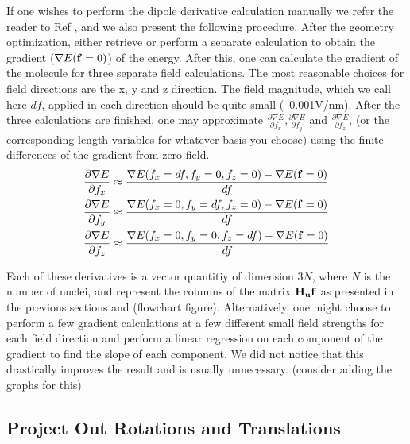 If one wishes to perform the dipole derivative calculation manually we refer the reader
to Ref \cite{kom}, and we also present the following procedure.  
After the geometry optimization, either retrieve or perform a separate calculation to obtain the gradient ($\nabla E({\bf{f}}=0)$) of the energy. 
After this, one can calculate the gradient of the molecule for three separate field calculations.  
The most reasonable choices for field directions are the x, y and z direction.  
The field magnitude, which we call here $df$,  applied in each direction should be quite
small (~0.001V/nm).  
After the three calculations are finished, one may approximate $\frac{\partial \nabla E}{\partial f_x}$,$\frac{\partial \nabla E}{\partial f_y}$ and 
$\frac{\partial \nabla E}{\partial f_z}$, (or the corresponding length variables for whatever basis you choose) using the finite differences of the gradient from zero field.
\begin{equation} 
\begin{split}
\frac{\partial \nabla E}{\partial f_x} &\approx \frac{\nabla E(f_x = df, f_y=0, f_z=0)-\nabla E({\bf{f}}=0)}{df} \\
\frac{\partial \nabla E}{\partial f_y} &\approx \frac{\nabla E(f_x = 0, f_y=df, f_z=0)-\nabla E({\bf{f}}=0)}{df} \\
\frac{\partial \nabla E}{\partial f_z} &\approx \frac{\nabla E(f_x = 0, f_y=0, f_z=df)-\nabla E({\bf{f}}=0)}{df}
\end{split}
\end{equation}

Each of these derivatives is a vector quantitiy of dimension $3N$, where $N$ is the number of nuclei, and represent the columns of the matrix ${\bf{H_uf}}$ as presented in the previous sections 
and (flowchart figure).
Alternatively, one might choose to perform a few gradient calculations at a few different small field strengths for each field direction and perform a linear regression on each component of the gradient
to find the slope of each component. 
We did not notice that this drastically improves the result and is usually unnecessary.  (consider adding the graphs for this)

\subsection{Project Out Rotations and Translations}


